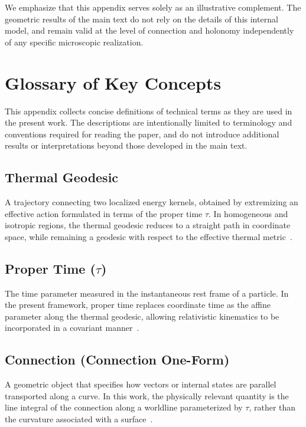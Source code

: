 \documentclass[%
 reprint,
 amsmath,amssymb,
 aps,
 prb,
]{revtex4-2}
\numberwithin{equation}{section}
\begin{document}
We emphasize that this appendix serves solely as an illustrative complement. The geometric results of the main text do not rely on the details of this internal model, and remain valid at the level of connection and holonomy independently of any specific microscopic realization.

\section{Glossary of Key Concepts}
\label{app:glossary}

This appendix collects concise definitions of technical terms as they are used in the present work. The descriptions are intentionally limited to terminology and conventions required for reading the paper, and do not introduce additional results or interpretations beyond those developed in the main text.

\subsection*{Thermal Geodesic}
A trajectory connecting two localized energy kernels, obtained by extremizing an effective action formulated in terms of the proper time $\tau$. In homogeneous and isotropic regions, the thermal geodesic reduces to a straight path in coordinate space, while remaining a geodesic with respect to the effective thermal metric~\cite{hanamura17765017}.

\subsection*{Proper Time ($\tau$)}
The time parameter measured in the instantaneous rest frame of a particle. In the present framework, proper time replaces coordinate time as the affine parameter along the thermal geodesic, allowing relativistic kinematics to be incorporated in a covariant manner~\cite{schwinger1951,bjorken1964}.

\subsection*{Connection (Connection One-Form)}
A geometric object that specifies how vectors or internal states are parallel transported along a curve. In this work, the physically relevant quantity is the line integral of the connection along a worldline parameterized by $\tau$, rather than the curvature associated with a surface~\cite{nakahara2003}.
\end{document}
